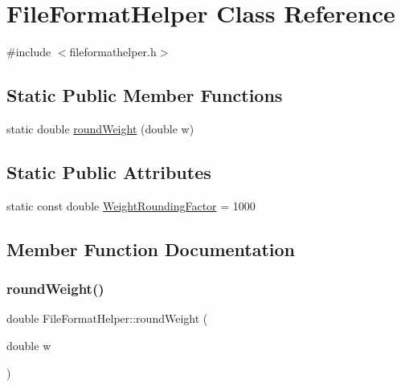 \hypertarget{class_file_format_helper}{}\section{File\+Format\+Helper Class Reference}
\label{class_file_format_helper}


{\ttfamily \#include $<$fileformathelper.\+h$>$}

\subsection*{Static Public Member Functions}
\begin{DoxyCompactItemize}
\item 
static double \mbox{\hyperlink{class_file_format_helper_a077af8e5274ebdb40fdc43a830c1bea2}{round\+Weight}} (double w)
\end{DoxyCompactItemize}
\subsection*{Static Public Attributes}
\begin{DoxyCompactItemize}
\item 
static const double \mbox{\hyperlink{class_file_format_helper_a25058f5ac8d0b426355a007362f04100}{Weight\+Rounding\+Factor}} = 1000
\end{DoxyCompactItemize}


\subsection{Member Function Documentation}
\mbox{\label{class_file_format_helper_a077af8e5274ebdb40fdc43a830c1bea2}} 
\subsubsection{\texorpdfstring{roundWeight()}{roundWeight()}}
{\footnotesize\ttfamily double File\+Format\+Helper\+::round\+Weight (\begin{DoxyParamCaption}\item[{double}]{w }\end{DoxyParamCaption})\hspace{0.3cm}{\ttfamily [static]}}



